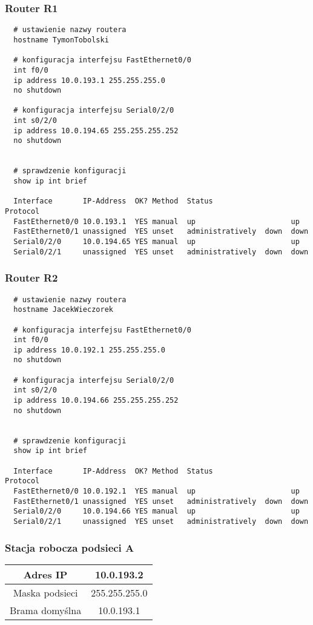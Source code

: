 \documentclass[wide,a4paper,titlepage,12pt] {article}
\begin{document}
  \subsubsection{Router R1}


  \begin{verbatim}
  # ustawienie nazwy routera
  hostname TymonTobolski

  # konfiguracja interfejsu FastEthernet0/0
  int f0/0
  ip address 10.0.193.1 255.255.255.0
  no shutdown

  # konfiguracja interfejsu Serial0/2/0
  int s0/2/0
  ip address 10.0.194.65 255.255.255.252
  no shutdown


  # sprawdzenie konfiguracji
  show ip int brief

  Interface       IP-Address  OK? Method  Status                  Protocol
  FastEthernet0/0 10.0.193.1  YES manual  up                      up
  FastEthernet0/1 unassigned  YES unset   administratively  down  down
  Serial0/2/0     10.0.194.65 YES manual  up                      up
  Serial0/2/1     unassigned  YES unset   administratively  down  down
  \end{verbatim}

  \subsubsection{Router R2}

  \begin{verbatim}
  # ustawienie nazwy routera
  hostname JacekWieczorek

  # konfiguracja interfejsu FastEthernet0/0
  int f0/0
  ip address 10.0.192.1 255.255.255.0
  no shutdown

  # konfiguracja interfejsu Serial0/2/0
  int s0/2/0
  ip address 10.0.194.66 255.255.255.252
  no shutdown


  # sprawdzenie konfiguracji
  show ip int brief

  Interface       IP-Address  OK? Method  Status                  Protocol
  FastEthernet0/0 10.0.192.1  YES manual  up                      up
  FastEthernet0/1 unassigned  YES unset   administratively  down  down
  Serial0/2/0     10.0.194.66 YES manual  up                      up
  Serial0/2/1     unassigned  YES unset   administratively  down  down
  \end{verbatim}

  \subsubsection{Stacja robocza podsieci A}
  \begin{center}
    \begin{tabular}{|c|c|}
      \hline
      Adres IP & 10.0.193.2 \\
      \hline
      Maska podsieci & 255.255.255.0 \\
      \hline
      Brama domyślna & 10.0.193.1 \\
      \hline
    \end{tabular}
  \end{center}
\end{document}
